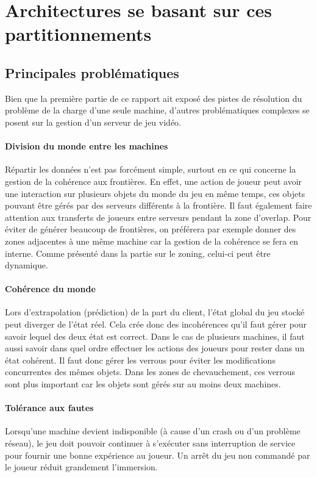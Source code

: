 \section{Architectures se basant sur ces partitionnements}

\subsection{Principales problématiques}
Bien que la première partie de ce rapport ait exposé des pistes de résolution du problème de la charge d'une seule machine, d'autres problématiques complexes se posent sur la gestion d'un serveur de jeu vidéo.

\paragraph{Division du monde entre les machines\\}
Répartir les données n'est pas forcément simple, surtout en ce qui concerne la gestion de la cohérence aux frontières.
En effet, une action de joueur peut avoir une interaction sur plusieurs objets du monde du jeu en même temps, ces objets pouvant être gérés par des serveurs différents à la frontière.
Il faut également faire attention aux transferts de joueurs entre serveurs pendant la zone d'overlap.
Pour éviter de générer beaucoup de frontières, on préférera par exemple donner des zones adjacentes à une même machine car la gestion de la cohérence se fera en interne.
Comme présenté dans la partie sur le zoning, celui-ci peut être dynamique.

\paragraph{Cohérence du monde\\}
Lors d'extrapolation (prédiction) de la part du client, l'état global du jeu stocké peut diverger de l'état réel.
Cela crée donc des incohérences qu'il faut gérer pour savoir lequel des deux état est correct.
Dans le cas de plusieurs machines, il faut aussi savoir dans quel ordre effectuer les actions des joueurs pour rester dans un état cohérent.
Il faut donc gérer les verrous pour éviter les modifications concurrentes des mêmes objets.
Dans les zones de chevauchement, ces verrous sont plus important car les objets sont gérés sur au moins deux machines.

\paragraph{Tolérance aux fautes\\}
Lorsqu'une machine devient indisponible (à cause d'un crash ou d'un problème réseau), le jeu doit pouvoir continuer à s'exécuter sans interruption de service pour fournir une bonne expérience au joueur.
Un arrêt du jeu non commandé par le joueur réduit grandement l'immersion.

